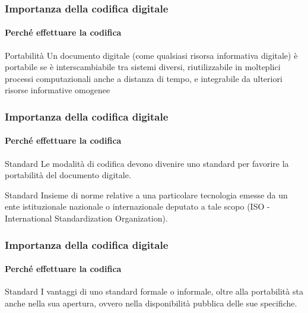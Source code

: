 

\begin{frame}
	\frametitle{Importanza della codifica digitale}
	\framesubtitle{Perché effettuare la codifica}
	\addtocounter{nframe}{1}

	\begin{block}{Portabilità}
		Un documento digitale (come qualsiasi risorsa informativa digitale) è portabile se è interscambiabile tra sistemi diversi, riutilizzabile in molteplici processi computazionali anche a distanza di tempo, e integrabile da ulteriori risorse informative omogenee
	\end{block}
\end{frame}

\begin{frame}
	\frametitle{Importanza della codifica digitale}
	\framesubtitle{Perché effettuare la codifica}
	\addtocounter{nframe}{1}

	\begin{block}{Standard}
		Le modalità di codifica devono divenire uno standard per favorire la portabilità del documento digitale.
	\end{block}

	\begin{block}{Standard}
		Insieme di norme relative a una particolare tecnologia emesse da un ente istituzionale nazionale o internazionale deputato a tale scopo (ISO - International Standardization Organization).
	\end{block}
\end{frame}


\begin{frame}
	\frametitle{Importanza della codifica digitale}
	\framesubtitle{Perché effettuare la codifica}
	\addtocounter{nframe}{1}

	\begin{block}{Standard}
		I vantaggi di uno standard formale o informale, oltre alla portabilità sta anche nella sua apertura, ovvero nella disponibilità pubblica delle sue specifiche.
	\end{block}

\end{frame}


